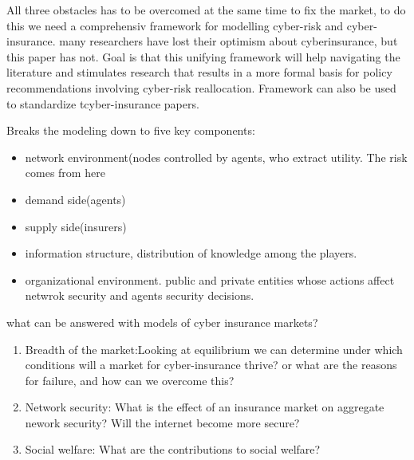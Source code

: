 All three obstacles has to be overcomed at the same time to fix the market,
 to do this we need a comprehensiv framework for modelling cyber-risk and cyber-insurance.
many researchers have lost their optimism about cyberinsurance, but this paper has not.
Goal is that this unifying framework will help navigating the literature and stimulates research that results in a more
formal basis for policy recommendations involving cyber-risk reallocation. Framework can also be used to standardize tcyber-insurance papers.

Breaks the modeling down to five key components: 
\begin{itemize}[topsep=-1em,parsep=0em,itemsep=0em] 
 \item network environment(nodes controlled by agents, who extract utility. 
 The risk comes from here \item demand side(agents) \item supply side(insurers) 
 \item information structure, distribution of knowledge among the players. 
 \item organizational environment. 
 public and private entities whose actions affect netwrok security and agents security decisions.
 
\end{itemize}

what can be answered with models of cyber insurance markets?

\begin{enumerate}
\item Breadth of the market:Looking at equilibrium we can determine under which conditions will a market for
 cyber-insurance thrive? or what are the reasons for failure, and how can we overcome this?
\item Network security: What is the effect of an insurance market on aggregate nework security? Will the internet become more secure?
\item Social welfare: What are the contributions to social welfare?

\end{enumerate}

